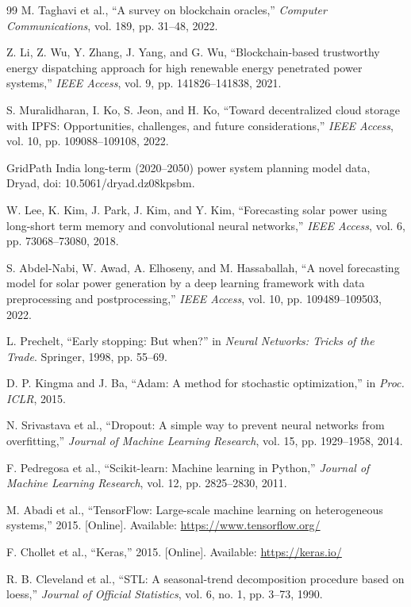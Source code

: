 \documentclass{ieeeaccess}
\begin{document}
\begin{thebibliography}{99}
M. Taghavi et al., ``A survey on blockchain oracles,'' \emph{Computer Communications}, vol. 189, pp. 31--48, 2022.

Z. Li, Z. Wu, Y. Zhang, J. Yang, and G. Wu, ``Blockchain-based trustworthy energy dispatching approach for high renewable energy penetrated power systems,'' \emph{IEEE Access}, vol. 9, pp. 141826--141838, 2021.

S. Muralidharan, I. Ko, S. Jeon, and H. Ko, ``Toward decentralized cloud storage with IPFS: Opportunities, challenges, and future considerations,'' \emph{IEEE Access}, vol. 10, pp. 109088--109108, 2022.

GridPath India long-term (2020--2050) power system planning model data, Dryad, doi: 10.5061/dryad.dz08kpsbm.

W. Lee, K. Kim, J. Park, J. Kim, and Y. Kim, ``Forecasting solar power using long-short term memory and convolutional neural networks,'' \emph{IEEE Access}, vol. 6, pp. 73068--73080, 2018.

S. Abdel-Nabi, W. Awad, A. Elhoseny, and M. Hassaballah, ``A novel forecasting model for solar power generation by a deep learning framework with data preprocessing and postprocessing,'' \emph{IEEE Access}, vol. 10, pp. 109489--109503, 2022.

L. Prechelt, ``Early stopping: But when?'' in \emph{Neural Networks: Tricks of the Trade}. Springer, 1998, pp. 55--69.

D. P. Kingma and J. Ba, ``Adam: A method for stochastic optimization,'' in \emph{Proc. ICLR}, 2015.

N. Srivastava et al., ``Dropout: A simple way to prevent neural networks from overfitting,'' \emph{Journal of Machine Learning Research}, vol. 15, pp. 1929--1958, 2014.

F. Pedregosa et al., ``Scikit-learn: Machine learning in Python,'' \emph{Journal of Machine Learning Research}, vol. 12, pp. 2825--2830, 2011.

M. Abadi et al., ``TensorFlow: Large-scale machine learning on heterogeneous systems,'' 2015. [Online]. Available: \url{https://www.tensorflow.org/}

F. Chollet et al., ``Keras,'' 2015. [Online]. Available: \url{https://keras.io/}

R. B. Cleveland et al., ``STL: A seasonal-trend decomposition procedure based on loess,'' \emph{Journal of Official Statistics}, vol. 6, no. 1, pp. 3--73, 1990.


\end{thebibliography}
\end{document}
